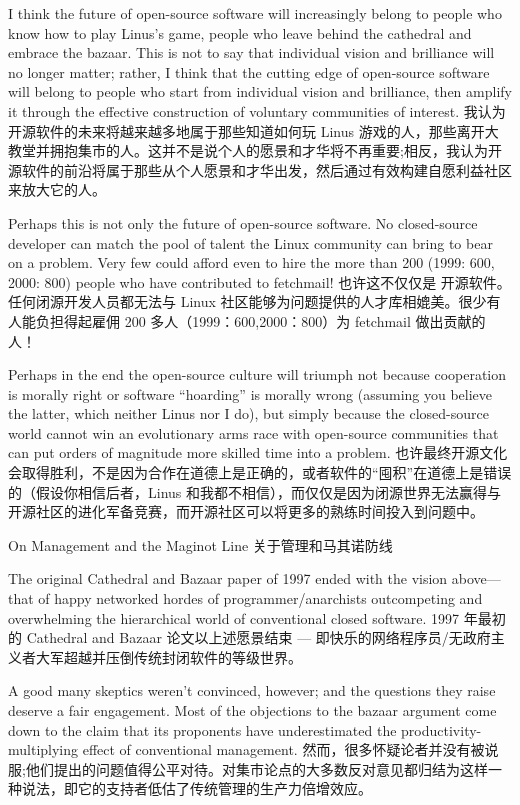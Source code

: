 \documentclass[a4paper,12pt,UTF8,twoside]{ctexbook}
\begin{document}
I think the future of open-source software will increasingly belong to people who know how to play Linus's game, people who leave behind the cathedral and embrace the bazaar. This is not to say that individual vision and brilliance will no longer matter; rather, I think that the cutting edge of open-source software will belong to people who start from individual vision and brilliance, then amplify it through the effective construction of voluntary communities of interest.
我认为开源软件的未来将越来越多地属于那些知道如何玩 Linus 游戏的人，那些离开大教堂并拥抱集市的人。这并不是说个人的愿景和才华将不再重要;相反，我认为开源软件的前沿将属于那些从个人愿景和才华出发，然后通过有效构建自愿利益社区来放大它的人。

Perhaps this is not only the future of open-source software. No closed-source developer can match the pool of talent the Linux community can bring to bear on a problem. Very few could afford even to hire the more than 200 (1999: 600, 2000: 800) people who have contributed to fetchmail!
也许这不仅仅是 开源软件。任何闭源开发人员都无法与 Linux 社区能够为问题提供的人才库相媲美。很少有人能负担得起雇佣 200 多人（1999：600,2000：800）为 fetchmail 做出贡献的人！

Perhaps in the end the open-source culture will triumph not because cooperation is morally right or software ``hoarding'' is morally wrong (assuming you believe the latter, which neither Linus nor I do), but simply because the closed-source world cannot win an evolutionary arms race with open-source communities that can put orders of magnitude more skilled time into a problem.
也许最终开源文化会取得胜利，不是因为合作在道德上是正确的，或者软件的“囤积”在道德上是错误的（假设你相信后者，Linus 和我都不相信），而仅仅是因为闭源世界无法赢得与开源社区的进化军备竞赛，而开源社区可以将更多的熟练时间投入到问题中。

On Management and the Maginot Line
关于管理和马其诺防线

The original Cathedral and Bazaar paper of 1997 ended with the vision above—that of happy networked hordes of programmer/anarchists outcompeting and overwhelming the hierarchical world of conventional closed software.
1997 年最初的 Cathedral and Bazaar 论文以上述愿景结束 — 即快乐的网络程序员/无政府主义者大军超越并压倒传统封闭软件的等级世界。

A good many skeptics weren't convinced, however; and the questions they raise deserve a fair engagement. Most of the objections to the bazaar argument come down to the claim that its proponents have underestimated the productivity-multiplying effect of conventional management.
然而，很多怀疑论者并没有被说服;他们提出的问题值得公平对待。对集市论点的大多数反对意见都归结为这样一种说法，即它的支持者低估了传统管理的生产力倍增效应。
\end{document}
